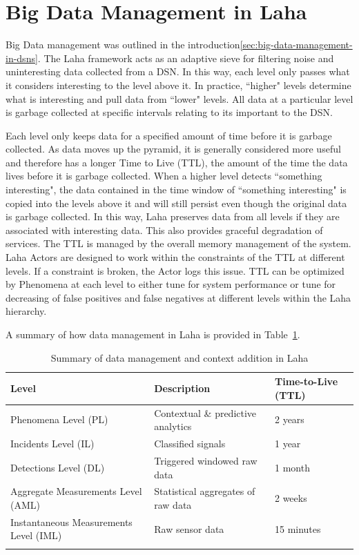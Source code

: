\section{Big Data Management in Laha} \label{sec:big-data-management}
Big Data management was outlined in the introduction\ref{sec:big-data-management-in-dsns}. The Laha framework acts as an adaptive sieve for filtering noise and uninteresting data collected from a DSN. In this way, each level only passes what it considers interesting to the level above it. In practice, ``higher" levels determine what is interesting and pull data from ``lower" levels. All data at a particular level is garbage collected at specific intervals relating to its important to the DSN\@.

Each level only keeps data for a specified amount of time before it is garbage collected. As data moves up the pyramid, it is generally considered more useful and therefore has a longer Time to Live (TTL), the amount of the time the data lives before it is garbage collected.  When a higher level detects ``something interesting", the data contained in the time window of ``something interesting" is copied into the levels above it and will still persist even though the original data is garbage collected. In this way, Laha preserves data from all levels if they are associated with interesting data. This also provides graceful degradation of services. The TTL is managed by the overall memory management of the system. Laha Actors are designed to work within the constraints of the TTL at different levels. If a constraint is broken, the Actor logs this issue. TTL can be optimized by Phenomena at each level to either tune for system performance or tune for decreasing of false positives and false negatives at different levels within the Laha hierarchy.

A summary of how data management in Laha is provided in Table~\ref{data-managament-table}.

\begin{table}[h]
	\centering
	\begin{tabularx}{\textwidth}{lXl}
		\toprule
		\textbf{Level} & \textbf{Description} & \textbf{Time-to-Live (TTL)} \\
		\midrule
		Phenomena Level (PL) & Contextual \& predictive analytics & 2 years \\
		Incidents Level (IL) & Classified signals & 1 year \\
		Detections Level (DL) & Triggered windowed raw data & 1 month  \\
		Aggregate Measurements Level (AML) & Statistical aggregates of raw data  & 2 weeks  \\
		Instantaneous Measurements Level (IML) & Raw sensor data  & 15 minutes \\
		\bottomrule
		\label{data-managament-table}
	\end{tabularx}
	\caption{Summary of data management and context addition in Laha}
\end{table}

